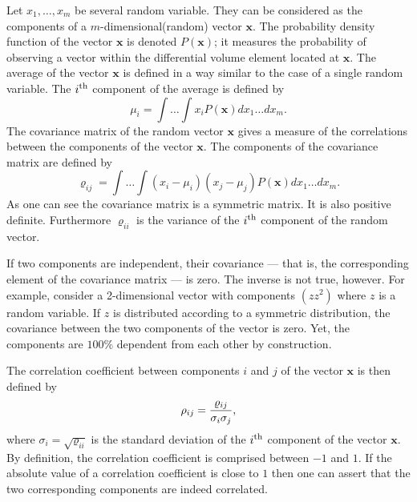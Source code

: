 Let $x_1,\ldots,x_m$ be several random variable. They can be
considered as the components of a $m$-dimensional(random) vector
$\textbf{x}$. The probability density function of the vector $\textbf{
x}$ is denoted $P\left(\textbf{x}\right)$; it measures the
probability of observing a vector within the differential volume
element located at $\textbf{x}$. The average of the vector $\textbf{x}$
is defined in a way similar to the case of a single random
variable. The $i^{\mathop{\textrm{th}}}$ component of the average is defined by
\begin{equation}
 \mu_i=\int\ldots\int x_i P\left(\textbf{x}\right)dx_1\ldots dx_m.
\end{equation}
The covariance matrix of the random vector $\textbf{x}$ gives a
measure of the correlations between the components of the vector
$\textbf{x}$. The components of the covariance matrix are defined by
\begin{equation}
 \varrho_{ij}=\int\ldots\int \left(x_i-\mu_i\right)\left(x_j-\mu_j\right)
  P\left(\textbf{x}\right)dx_1\ldots dx_m.
\end{equation}
As one can see the covariance matrix is a symmetric matrix. It is
also positive definite. Furthermore $\varrho_{ii}$ is the variance
of the $i^{\mathop{\textrm{th}}}$ component of the random vector.


If two components are independent, their covariance --- that is,
the corresponding element of the covariance matrix --- is zero.
The inverse is not true, however. For example, consider a
2-dimensional vector with components $\left(z z^2\right)$ where
$z$ is a random variable. If $z$ is distributed according to a
symmetric distribution, the covariance between the two components
of the vector is zero. Yet, the components are $100\%$ dependent
from each other by construction.

The correlation coefficient between components $i$ and $j$ of the
vector $\textbf{x}$ is then defined by
\begin{equation}
 \rho_{ij}={\varrho_{ij}\over \sigma_i \sigma_j},
\end{equation}
where $\sigma_i=\sqrt{\varrho_{ii}}$ is the standard deviation of
the $i^{\mathop{\textrm{th}}}$ component of the vector $\textbf{x}$. By definition, the
correlation coefficient is comprised between $-1$ and $1$. If the
absolute value of a correlation coefficient is close to $1$ then
one can assert that the two corresponding components are indeed
correlated.

